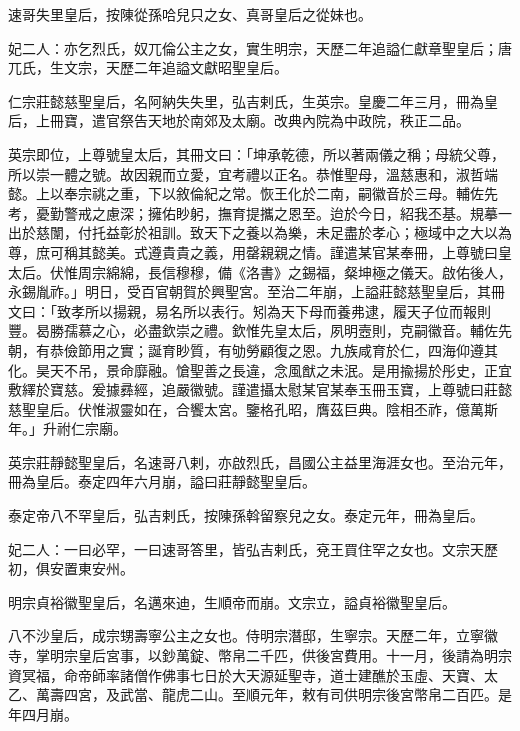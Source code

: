 \begin{pinyinscope}
 速哥失里皇后，按陳從孫哈兒只之女、真哥皇后之從妹也。



 妃二人：亦乞烈氏，奴兀倫公主之女，實生明宗，天歷二年追謚仁獻章聖皇后；唐兀氏，生文宗，天歷二年追謚文獻昭聖皇后。



 仁宗莊懿慈聖皇后，名阿納失失里，弘吉剌氏，生英宗。皇慶二年三月，冊為皇后，上冊寶，遣官祭告天地於南郊及太廟。改典內院為中政院，秩正二品。



 英宗即位，上尊號皇太后，其冊文曰：「坤承乾德，所以著兩儀之稱；母統父尊，所以崇一體之號。故因親而立愛，宜考禮以正名。恭惟聖母，溫慈惠和，淑哲端懿。上以奉宗祧之重，下以敘倫紀之常。恢王化於二南，嗣徽音於三母。輔佐先考，憂勤警戒之慮深；擁佑眇躬，撫育提攜之恩至。迨於今日，紹我丕基。規摹一出於慈闈，付托益彰於祖訓。致天下之養以為樂，未足盡於孝心；極域中之大以為尊，庶可稱其懿美。式遵貴貴之義，用罄親親之情。謹遣某官某奉冊，上尊號曰皇太后。伏惟周宗綿綿，長信穆穆，備《洛書》之錫福，粲坤極之儀天。啟佑後人，永錫胤祚。」明日，受百官朝賀於興聖宮。至治二年崩，上謚莊懿慈聖皇后，其冊文曰：「致孝所以揚親，易名所以表行。矧為天下母而養弗逮，履天子位而報則豐。曷勝孺慕之心，必盡欽崇之禮。欽惟先皇太后，夙明壼則，克嗣徽音。輔佐先朝，有恭儉節用之實；誕育眇質，有劬勞顧復之恩。九族咸育於仁，四海仰遵其化。昊天不吊，景命靡融。愴聖善之長違，念風猷之未泯。是用揄揚於彤史，正宜敷繹於寶慈。爰據彞經，追嚴徽號。謹遣攝太慰某官某奉玉冊玉寶，上尊號曰莊懿慈聖皇后。伏惟淑靈如在，合饗太宮。鑒格孔昭，膺茲巨典。陰相丕祚，億萬斯年。」升祔仁宗廟。



 英宗莊靜懿聖皇后，名速哥八剌，亦啟烈氏，昌國公主益里海涯女也。至治元年，冊為皇后。泰定四年六月崩，謚曰莊靜懿聖皇后。



 泰定帝八不罕皇后，弘吉剌氏，按陳孫斡留察兒之女。泰定元年，冊為皇后。



 妃二人：一曰必罕，一曰速哥答里，皆弘吉剌氏，兗王買住罕之女也。文宗天歷初，俱安置東安州。



 明宗貞裕徽聖皇后，名邁來迪，生順帝而崩。文宗立，謚貞裕徽聖皇后。



 八不沙皇后，成宗甥壽寧公主之女也。侍明宗潛邸，生寧宗。天歷二年，立寧徽寺，掌明宗皇后宮事，以鈔萬錠、幣帛二千匹，供後宮費用。十一月，後請為明宗資冥福，命帝師率諸僧作佛事七日於大天源延聖寺，道士建醮於玉虛、天寶、太乙、萬壽四宮，及武當、龍虎二山。至順元年，敕有司供明宗後宮幣帛二百匹。是年四月崩。




\end{pinyinscope}
